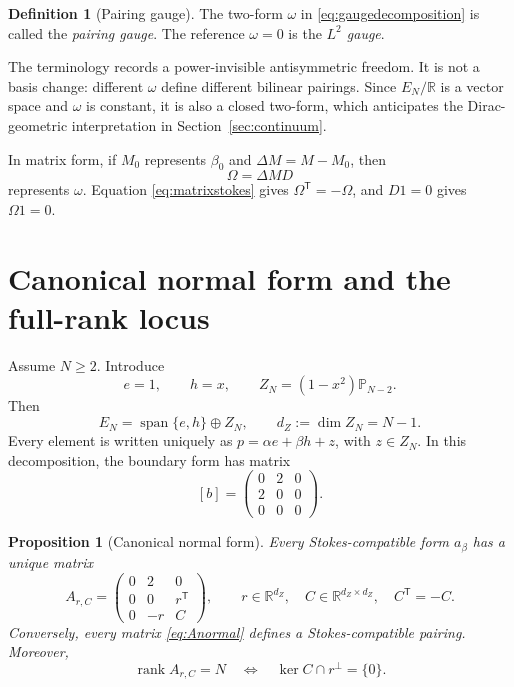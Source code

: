 \documentclass[11pt,a4paper]{article}
\newtheorem{proposition}[theorem]{Proposition}
\theoremstyle{definition}
\newtheorem{definition}[theorem]{Definition}
\theoremstyle{remark}
\newcommand{\R}{\mathbb{R}}
\newcommand{\Pp}{\mathbb{P}}
\newcommand{\Ker}{\operatorname{ker}}
\newcommand{\rank}{\operatorname{rank}}
\newcommand{\spanof}{\operatorname{span}}
\begin{document}
\begin{definition}[Pairing gauge]
The two-form $\omega$ in \eqref{eq:gaugedecomposition} is called the \emph{pairing gauge}.
The reference $\omega=0$ is the \emph{$L^2$ gauge}.
\end{definition}

The terminology records a power-invisible antisymmetric freedom.  It is not a basis change:
different $\omega$ define different bilinear pairings.  Since $E_N/\R$ is a vector space and
$\omega$ is constant, it is also a closed two-form, which anticipates the Dirac-geometric
interpretation in Section~\ref{sec:continuum}.

In matrix form, if $M_0$ represents $\beta_0$ and $\Delta M=M-M_0$, then
\begin{equation}\label{eq:omegamatrix}
 \Omega=\Delta M D
\end{equation}
represents $\omega$.  Equation \eqref{eq:matrixstokes} gives
$\Omega^{\mathsf T}=-\Omega$, and $D1=0$ gives $\Omega1=0$.

\section{Canonical normal form and the full-rank locus}

Assume $N\geq2$.  Introduce
\[
 e=1,\qquad h=x,\qquad
 Z_N=(1-x^2)\Pp_{N-2}.
\]
Then
\begin{equation}\label{eq:decompositionE}
 E_N=\spanof\{e,h\}\oplus Z_N,
 \qquad d_Z:=\dim Z_N=N-1.
\end{equation}
Every element is written uniquely as
$p=\alpha e+\beta h+z$, with $z\in Z_N$.  In this decomposition, the boundary form has
matrix
\begin{equation}\label{eq:Bnormal}
 [b]=
 \begin{pmatrix}
 0&2&0\\
 2&0&0\\
 0&0&0
 \end{pmatrix}.
\end{equation}

\begin{proposition}[Canonical normal form]\label{prop:normalform}
Every Stokes-compatible form $a_\beta$ has a unique matrix
\begin{equation}\label{eq:Anormal}
 A_{r,C}=
 \begin{pmatrix}
 0&2&0\\
 0&0&r^{\mathsf T}\\
 0&-r&C
 \end{pmatrix},
 \qquad r\in\R^{d_Z},\quad C\in\R^{d_Z\times d_Z},\quad C^{\mathsf T}=-C.
\end{equation}
Conversely, every matrix \eqref{eq:Anormal} defines a Stokes-compatible pairing.
Moreover,
\begin{equation}\label{eq:rankcondition}
 \rank A_{r,C}=N
 \quad\Longleftrightarrow\quad
 \Ker C\cap r^\perp=\{0\}.
\end{equation}
\end{proposition}
\end{document}
